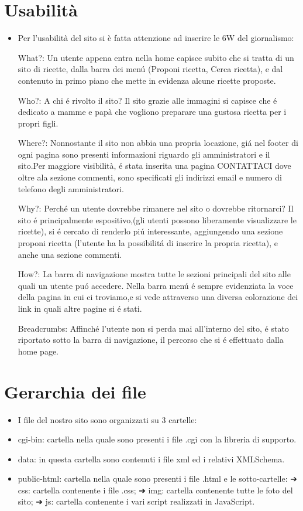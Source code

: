 \documentclass[12pt]{article}
\begin{document}
			\section{Usabilit\`a}
			\begin{itemize}
				\item Per l'usabilit\`a del sito si è fatta attenzione ad inserire le 6W del giornalismo:
				
				\subitem What?: 
				Un utente appena entra nella home capisce subito che si tratta di un sito di ricette, dalla barra dei men\'u (Proponi ricetta, Cerca ricetta), e dal contenuto in primo piano che mette in evidenza alcune ricette proposte.
				
				\subitem Who?:
				 A chi \'e rivolto il sito? Il sito grazie alle immagini si capisce che \'e dedicato a mamme e pap\`a
				che vogliono preparare una gustosa ricetta per i propri figli.
				
				\subitem Where?: 
				Nonnostante il sito non abbia una propria locazione, gi\'a  nel footer di ogni pagina sono presenti informazioni riguardo gli amministratori e il sito.Per maggiore visibilit\`a, \'e stata inserita una pagina CONTATTACI dove oltre ala sezione commenti, sono specificati gli indirizzi email e numero di telefono degli amministratori. 
				
				
				\subitem Why?: 
				Perch\'e un utente dovrebbe rimanere nel sito o dovrebbe ritornarci? Il sito \'e principalmente espositivo,(gli utenti possono liberamente visualizzare le ricette), si \'e cercato di renderlo pi\'u interessante, aggiungendo una sezione proponi ricetta (l'utente ha la possibilit\'a di inserire la propria ricetta), e anche una sezione commenti.
				
				\subitem How?:
				 La barra di navigazione mostra tutte le sezioni principali del sito alle quali un utente pu\'o accedere.
				Nella barra men\'u \'e sempre evidenziata la voce della pagina in cui ci troviamo,e si vede attraverso una diversa colorazione dei link in quali altre pagine si \'e stati. 

				
				Breadcrumbs: Affinch\'e l'utente non si perda mai all'interno del sito, \'e stato riportato sotto la barra di navigazione, il percorso che si \'e effettuato dalla home page.
				
			\end{itemize}
			\section{Gerarchia dei file}
			\begin{itemize}
				\item I file del nostro sito sono organizzati su 3 cartelle:
				\item cgi-bin: cartella nella quale sono presenti i file .cgi con la libreria di supporto.
				\item data: in questa cartella sono contenuti i file xml ed i relativi XMLSchema.
				\item public-html: cartella nella quale sono presenti i file .html e le sotto-cartelle:
				➔ css: cartella contenente i file .css;
				➔ img: cartella contenente tutte le foto del sito;
				➔ js: cartella contenente i vari script realizzati in JavaScript.
			\end{itemize}
\end{document}
